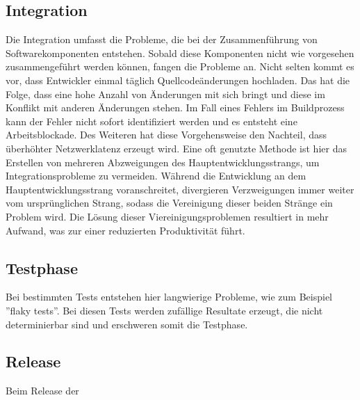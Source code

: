 \subsection{Integration} \label{Integration}
Die Integration umfasst die Probleme, die bei der Zusammenführung von Softwarekomponenten entstehen. Sobald diese Komponenten nicht wie vorgesehen zusammengeführt werden können, fangen die Probleme an. Nicht selten kommt es vor, dass Entwickler einmal täglich Quellcodeänderungen hochladen. Das hat die Folge, dass eine hohe Anzahl von Änderungen mit sich bringt und diese im Konflikt mit anderen Änderungen stehen. Im Fall eines Fehlers im Buildprozess kann der Fehler nicht sofort identifiziert werden und es entsteht eine Arbeitsblockade. Des Weiteren hat diese Vorgehensweise den Nachteil, dass überhöhter Netzwerklatenz erzeugt wird. Eine oft genutzte Methode ist hier das Erstellen von mehreren Abzweigungen des Hauptentwicklungsstrangs, um Integrationsprobleme zu vermeiden. Während die Entwicklung an dem Hauptentwicklungsstrang voranschreitet, divergieren Verzweigungen immer weiter vom ursprünglichen Strang, sodass die Vereinigung dieser beiden Stränge ein Problem wird. Die Lösung dieser Viereinigungsproblemen resultiert in mehr Aufwand, was zur einer reduzierten Produktivität führt. 

\subsection{Testphase}

Bei bestimmten Tests entstehen hier langwierige Probleme, wie zum Beispiel ''flaky tests''. Bei diesen Tests werden zufällige Resultate erzeugt, die nicht determinierbar sind und erschweren somit die Testphase. 


\subsection{Release}

Beim Release der 
